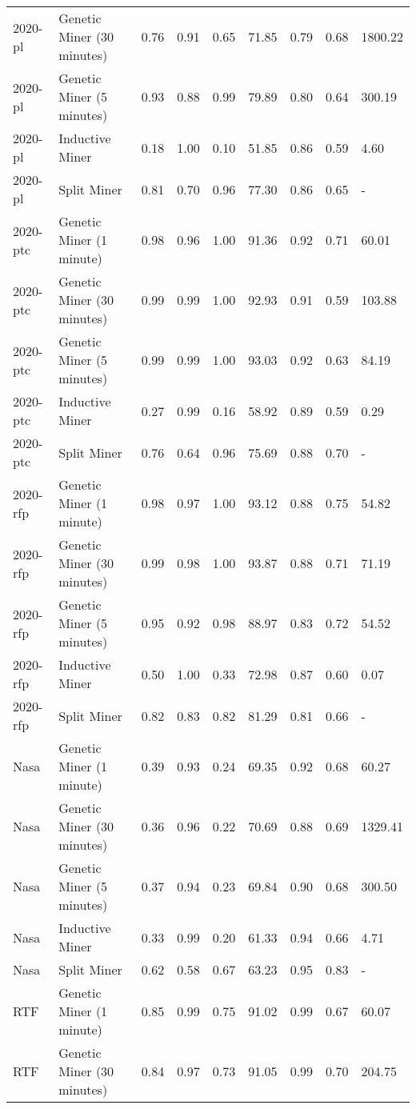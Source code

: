 \begin{tabular}{llrrrrrrl}
2020-pl & Genetic Miner (30 minutes) & 0.76 & 0.91 & 0.65 & 71.85 & 0.79 & 0.68 & 1800.22 \\
2020-pl & Genetic Miner (5 minutes) & 0.93 & 0.88 & 0.99 & 79.89 & 0.80 & 0.64 & 300.19 \\
2020-pl & Inductive Miner & 0.18 & 1.00 & 0.10 & 51.85 & 0.86 & 0.59 & 4.60 \\
2020-pl & Split Miner & 0.81 & 0.70 & 0.96 & 77.30 & 0.86 & 0.65 & - \\
2020-ptc & Genetic Miner (1 minute) & 0.98 & 0.96 & 1.00 & 91.36 & 0.92 & 0.71 & 60.01 \\
2020-ptc & Genetic Miner (30 minutes) & 0.99 & 0.99 & 1.00 & 92.93 & 0.91 & 0.59 & 103.88 \\
2020-ptc & Genetic Miner (5 minutes) & 0.99 & 0.99 & 1.00 & 93.03 & 0.92 & 0.63 & 84.19 \\
2020-ptc & Inductive Miner & 0.27 & 0.99 & 0.16 & 58.92 & 0.89 & 0.59 & 0.29 \\
2020-ptc & Split Miner & 0.76 & 0.64 & 0.96 & 75.69 & 0.88 & 0.70 & - \\
2020-rfp & Genetic Miner (1 minute) & 0.98 & 0.97 & 1.00 & 93.12 & 0.88 & 0.75 & 54.82 \\
2020-rfp & Genetic Miner (30 minutes) & 0.99 & 0.98 & 1.00 & 93.87 & 0.88 & 0.71 & 71.19 \\
2020-rfp & Genetic Miner (5 minutes) & 0.95 & 0.92 & 0.98 & 88.97 & 0.83 & 0.72 & 54.52 \\
2020-rfp & Inductive Miner & 0.50 & 1.00 & 0.33 & 72.98 & 0.87 & 0.60 & 0.07 \\
2020-rfp & Split Miner & 0.82 & 0.83 & 0.82 & 81.29 & 0.81 & 0.66 & - \\
Nasa & Genetic Miner (1 minute) & 0.39 & 0.93 & 0.24 & 69.35 & 0.92 & 0.68 & 60.27 \\
Nasa & Genetic Miner (30 minutes) & 0.36 & 0.96 & 0.22 & 70.69 & 0.88 & 0.69 & 1329.41 \\
Nasa & Genetic Miner (5 minutes) & 0.37 & 0.94 & 0.23 & 69.84 & 0.90 & 0.68 & 300.50 \\
Nasa & Inductive Miner & 0.33 & 0.99 & 0.20 & 61.33 & 0.94 & 0.66 & 4.71 \\
Nasa & Split Miner & 0.62 & 0.58 & 0.67 & 63.23 & 0.95 & 0.83 & - \\
RTF & Genetic Miner (1 minute) & 0.85 & 0.99 & 0.75 & 91.02 & 0.99 & 0.67 & 60.07 \\
RTF & Genetic Miner (30 minutes) & 0.84 & 0.97 & 0.73 & 91.05 & 0.99 & 0.70 & 204.75 \\

\end{tabular}
